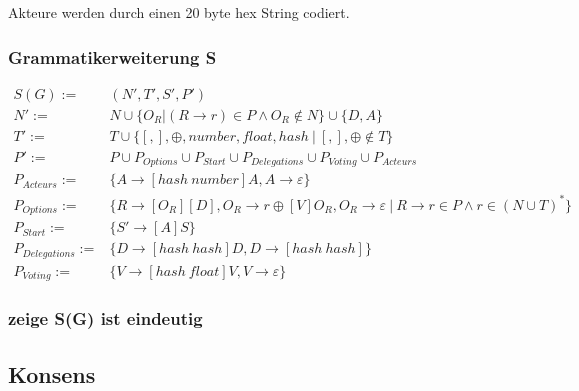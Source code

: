 \documentclass[]{article}
\begin{document}
Akteure werden durch einen 20 byte hex String codiert.










\subsubsection*{Grammatikerweiterung S}


$
\begin{array}{rl}
  S(G) :=& (N', T', S', P') \\
  N' :=& N \cup \{ O_R | (R\rightarrow r)\in P\land O_R \notin N\}\cup\{D, A\}\\
  T' :=& T \cup \{[ , ], \oplus, number, float, hash\ |\ [,],\oplus \notin T \}\\
  P' :=& P
  \cup P_{Options} 
  \cup P_{Start} 
  \cup P_{Delegations} 
  \cup P_{Voting} 
  \cup P_{Acteurs}
  \\
  P_{Acteurs} :=& \{A\rightarrow[hash\ number]A,A\rightarrow \varepsilon\} \\
  P_{Options} :=& \{R \rightarrow [O_R][D], O_R \rightarrow r\oplus [V] O_R, O_R \rightarrow \varepsilon \ \vert\ R\rightarrow r\in P
  \land r\in (N\cup T)^*\} \\
  P_{Start} :=& \{S'\rightarrow [A]S\} \\
  P_{Delegations} :=& \{D\rightarrow [hash\ hash]D,D\rightarrow [hash\ hash]\} \\
  P_{Voting} :=& \{V\rightarrow [hash\ float]V, V \rightarrow \varepsilon\}
\end{array}
$



\subsubsection*{zeige S(G) ist eindeutig}


\subsection{Konsens}
\end{document}
